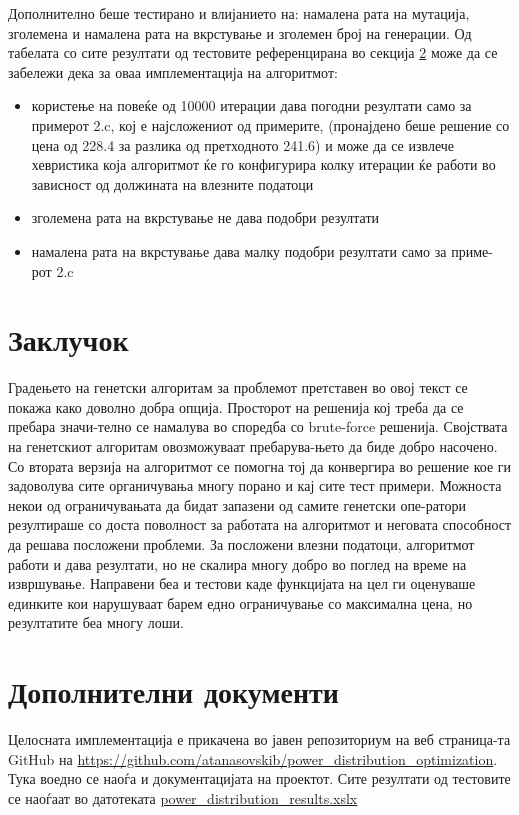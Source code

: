 \documentclass{article}
\begin{document}
Дополнително беше тестирано и влијанието на: намалена рата на мутација, зголемена и намалена рата на вкрстување и зголемен број на генерации. Од табелата со сите резултати од тестовите референцирана во секција \ref{sec_apendix} може да се забележи дека за оваа имплементација на алгоритмот:
\begin{itemize}
\item користење на повеќе од 10000 итерации дава погодни резултати само за примерот 2.c, кој е најсложениот од примерите, (пронајдено беше решение со цена од 228.4 за разлика од претходното 241.6) и може да се извлече хевристика која алгоритмот ќе го конфигурира колку итерации ќе работи во зависност од должината на влезните податоци
\item зголемена рата на вкрстување не дава подобри резултати
\item намалена рата на вкрстување дава малку подобри резултати само за приме-рот 2.c 
\end{itemize}

\section{Заклучок}
Градењето на генетски алгоритам за проблемот претставен во овој текст се покажа како доволно добра опција. Просторот на решенија кој треба да се пребара значи-телно се намалува во споредба со brute-force решенија. Својствата на генетскиот алгоритам овозможуваат пребарува-њето да биде добро насочено. Со втората верзија на алгоритмот се помогна тој да конвергира во решение кое ги задоволува сите органичувања многу порано и кај сите тест примери. Можноста некои од ограничувањата да бидат запазени од самите генетски опе-ратори резултираше со доста поволност за работата на алгоритмот и неговата способност да решава посложени проблеми. За посложени влезни податоци, алгоритмот работи и дава резултати, но не скалира многу добро во поглед на време на извршување.
Направени беа и тестови каде функцијата на цел ги оценуваше единките кои  нарушуваат барем едно ограничување со максимална цена, но резултатите беа многу лоши.
 
\section{Дополнителни документи}
\label{sec_apendix}
Целосната имплементација е прикачена во јавен репозиториум на веб страница-та GitHub на \href{https://github.com/atanasovskib/power_distribution_optimization}{https://github.com/atanasovskib/power\_distribution\_optimization}. Тука воедно се наоѓа и документацијата на проектот. Сите резултати од тестовите се наоѓаат во датотеката \href{https://github.com/atanasovskib/power_distribution_optimization/blob/master/docs_mk/power_distribution_results.xlsx}{power\_distribution\_results.xslx}
%
%
%
\end{document}
